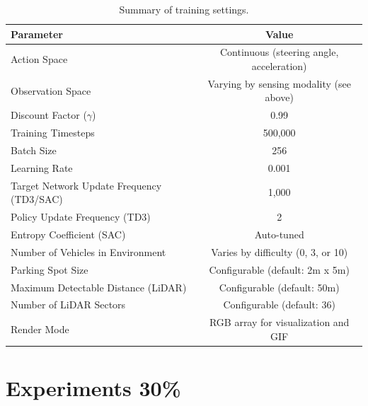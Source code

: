 \documentclass{article}
\begin{document}
\begin{table}[h]
  \centering
  \begin{tabular}{l|c}
    \hline
    \textbf{Parameter}                        & \textbf{Value}                            \\
    \hline
    Action Space                              & Continuous (steering angle, acceleration) \\
    Observation Space                         & Varying by sensing modality (see above)   \\
    Discount Factor ($\gamma$)                & 0.99                                      \\
    Training Timesteps                        & 500,000                                   \\
    Batch Size                                & 256                                       \\
    Learning Rate                             & 0.001                                     \\
    Target Network Update Frequency (TD3/SAC) & 1,000                                     \\
    Policy Update Frequency (TD3)             & 2                                         \\
    Entropy Coefficient (SAC)                 & Auto-tuned                                \\
    Number of Vehicles in Environment         & Varies by difficulty (0, 3, or 10)        \\
    Parking Spot Size                         & Configurable (default: 2m x 5m)           \\
    Maximum Detectable Distance (LiDAR)       & Configurable (default: 50m)               \\
    Number of LiDAR Sectors                   & Configurable (default: 36)                \\
    Render Mode                               & RGB array for visualization and GIF       \\
    \hline
  \end{tabular}
  \caption{Summary of training settings.}
  \label{tab:training_settings}
\end{table}

\section{Experiments 30\%}\label{sec:experiments}
\end{document}
